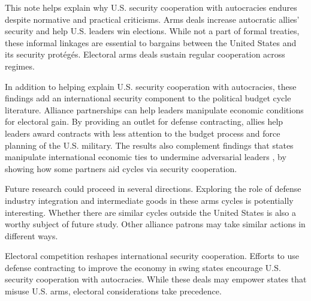 \documentclass[12pt]{article}
\begin{document}
This note helps explain why U.S. security cooperation with autocracies endures despite normative and practical criticisms. 
Arms deals increase autocratic allies' security and help U.S. leaders win elections.
While not a part of formal treaties, these informal linkages are essential to bargains between the United States and its security prot{\'e}g{\'e}s.
Electoral arms deals sustain regular cooperation across regimes.


In addition to helping explain U.S. security cooperation with autocracies, these findings add an international security component to the political budget cycle literature.
Alliance partnerships can help leaders manipulate economic conditions for electoral gain. 
By providing an outlet for defense contracting, allies help leaders award contracts with less attention to the budget process and force planning of the U.S. military.
The results also complement findings that states manipulate international economic ties to undermine adversarial leaders \citep{ChyzhUrbatsch2021, KimMargalit2021}, by showing how some partners aid cycles via security cooperation. 



Future research could proceed in several directions. 
Exploring the role of defense industry integration and intermediate goods in these arms cycles is potentially interesting.
Whether there are similar cycles outside the United States is also a worthy subject of future study. 
Other alliance patrons may take similar actions in different ways.


Electoral competition reshapes international security cooperation.
Efforts to use defense contracting to improve the economy in swing states encourage U.S. security cooperation with autocracies.
While these deals may empower states that misuse U.S. arms, electoral considerations take precedence. 


\newpage
\singlespace
 
 
\end{document}

